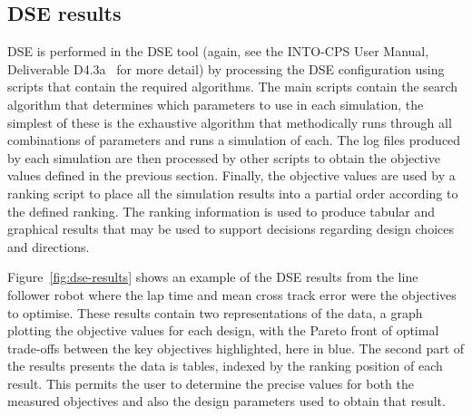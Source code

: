 \subsection{DSE results}

DSE is performed in the DSE tool (again, see the INTO-CPS User Manual, Deliverable D4.3a~\cite{INTOCPSD4.3a} for more detail) by processing the DSE configuration using scripts that contain the required algorithms.  The main scripts contain the search algorithm that determines which parameters to use in each simulation, the simplest of these is the exhaustive algorithm that methodically runs through all combinations of parameters and runs a simulation of each.  The log files produced by each simulation are then processed by other scripts to obtain the objective values defined in the previous section.  Finally, the objective values are used by a ranking script to place all the simulation results into a partial order according to the defined ranking.  The ranking information is used to produce tabular and graphical results that may be used to support decisions regarding design choices and directions.

Figure~\ref{fig:dse-results} shows an example of the DSE results from the line follower robot where the lap time and mean cross track error were the objectives to optimise.  These results contain two representations of the data, a graph plotting the objective values for each design, with the Pareto front of optimal trade-offs between the key objectives highlighted, here in blue. The second part of the results presents the data is tables, indexed by the ranking position of each result.  This permits the user to determine the precise values for both the measured objectives and also the design parameters used to obtain that result.

